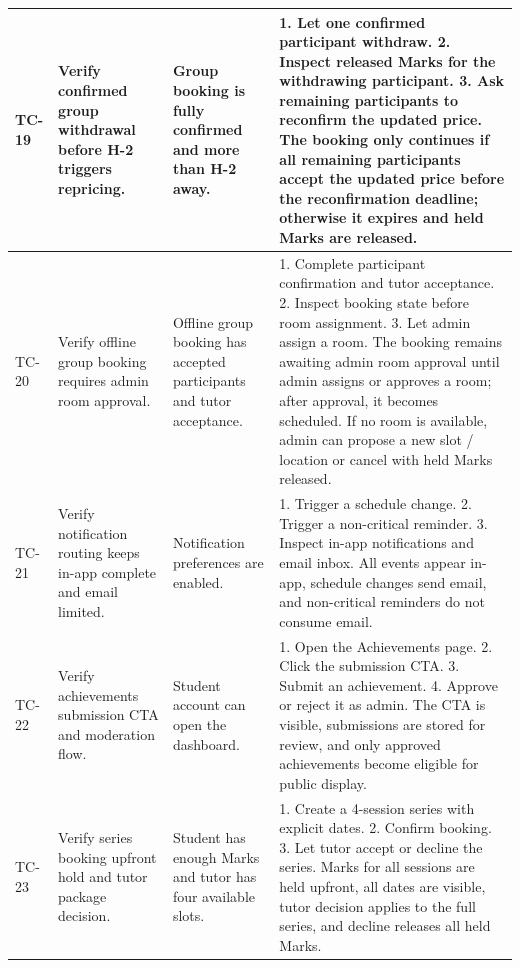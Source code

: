 \documentclass[11pt,a4paper]{article}
\begin{document}
\begin{longtable}{|L{1.2cm}|L{3.3cm}|L{3.9cm}|L{6.0cm}|}
	\hline
	TC-19          & Verify confirmed group withdrawal before H-2 triggers repricing.     & Group booking is fully confirmed and more than H-2 away.               & 1. Let one confirmed participant withdraw. 2. Inspect released Marks for the withdrawing participant. 3. Ask remaining participants to reconfirm the updated price. \newline The booking only continues if all remaining participants accept the updated price before the reconfirmation deadline; otherwise it expires and held Marks are released. \\
	\hline
	TC-20          & Verify offline group booking requires admin room approval.           & Offline group booking has accepted participants and tutor acceptance.   & 1. Complete participant confirmation and tutor acceptance. 2. Inspect booking state before room assignment. 3. Let admin assign a room. \newline The booking remains awaiting admin room approval until admin assigns or approves a room; after approval, it becomes scheduled. If no room is available, admin can propose a new slot / location or cancel with held Marks released. \\
	\hline
	TC-21          & Verify notification routing keeps in-app complete and email limited. & Notification preferences are enabled.                                  & 1. Trigger a schedule change. 2. Trigger a non-critical reminder. 3. Inspect in-app notifications and email inbox. \newline All events appear in-app, schedule changes send email, and non-critical reminders do not consume email.                                                                             \\
	\hline
	TC-22          & Verify achievements submission CTA and moderation flow.              & Student account can open the dashboard.                                & 1. Open the Achievements page. 2. Click the submission CTA. 3. Submit an achievement. 4. Approve or reject it as admin. \newline The CTA is visible, submissions are stored for review, and only approved achievements become eligible for public display.                                                      \\
	\hline
	TC-23          & Verify series booking upfront hold and tutor package decision.              & Student has enough Marks and tutor has four available slots.                                & 1. Create a 4-session series with explicit dates. 2. Confirm booking. 3. Let tutor accept or decline the series. \newline Marks for all sessions are held upfront, all dates are visible, tutor decision applies to the full series, and decline releases all held Marks.                                                      \\

\end{longtable}
\end{document}
